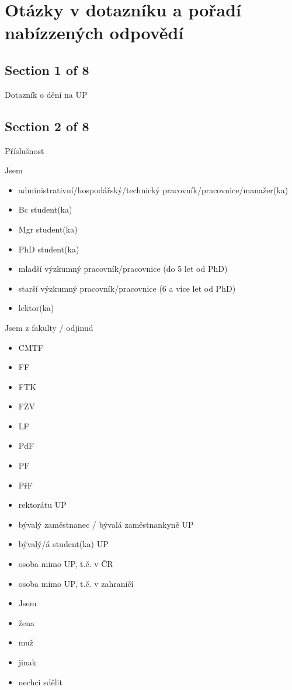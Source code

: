 \section{Otázky v dotazníku a pořadí nabízzených odpovědí}
\label{sec:otazky}

\subsection{Section 1 of 8}
Dotazník o dění na UP

\subsection{Section 2 of 8}
Příslušnost

Jsem
\begin{itemize}
      \item administrativní/hospodářský/technický pracovník/pracovnice/manažer(ka)
      \item Bc student(ka)
      \item Mgr student(ka)
      \item PhD student(ka)
      \item mladší výzkumný pracovník/pracovnice (do 5 let od PhD)
      \item starší výzkumný pracovník/pracovnice (6 a více let od PhD)
      \item lektor(ka)
\end{itemize}
        
Jsem z fakulty / odjinud
\begin{itemize}
      \item CMTF
      \item FF
      \item FTK
      \item FZV
      \item LF
      \item PdF
      \item PF
      \item PřF
      \item rektorátu UP
      \item bývalý zaměstnanec / bývalá zaměstnankyně UP
      \item bývalý/á student(ka) UP
      \item osoba mimo UP, t.č. v ČR
      \item osoba mimo UP, t.č. v zahraničí
      \item Jsem
      \item žena
      \item muž
      \item jinak
      \item nechci sdělit
\end{itemize}

